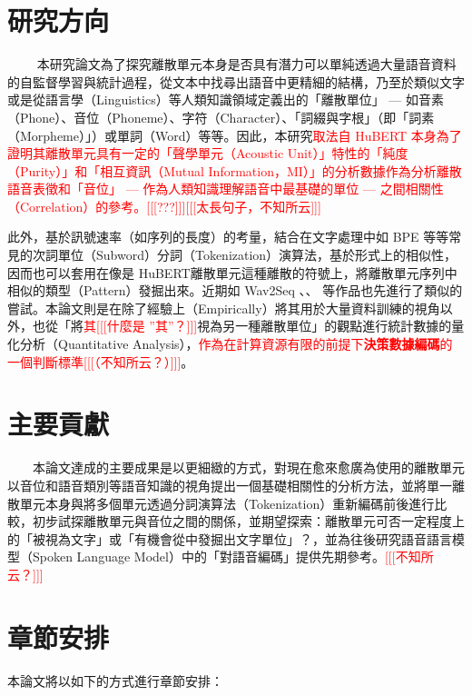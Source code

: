 \section{研究方向}
　　
本研究論文為了探究離散單元本身是否具有潛力可以單純透過大量語音資料的自監督學習與統計過程，從文本中找尋出語音中更精細的結構，乃至於類似文字或是從語言學（Linguistics）等人類知識領域定義出的「離散單位」 --- 如音素（Phone）、音位（Phoneme）、字符（Character）、「詞綴與字根」（即「詞素（Morpheme）」）或單詞（Word）等等。因此，本研究\textcolor{red}{取法自 HuBERT 本身為了證明其離散單元具有一定的「聲學單元（Acoustic Unit）」特性的「純度（Purity）」和「相互資訊（Mutual Information，MI）」的分析數據作為分析離散語音表徵和「音位」 --- 作為人類知識理解語音中最基礎的單位 --- 之間相關性（Correlation）的參考。[[[???]]][[[太長句子，不知所云]]]}

        此外，基於訊號速率（如序列的長度）的考量，結合在文字處理中如 BPE 等等常見的次詞單位（Subword）分詞（Tokenization）演算法，基於形式上的相似性，因而也可以套用在像是 HuBERT離散單元這種離散的符號上，將離散單元序列中相似的類型（Pattern）發掘出來。近期如 Wav2Seq \cite{wu_wav2seq_2023}、\cite{ren_speech_2022}、\cite{chang_exploring_2024} 等作品也先進行了類似的嘗試。本論文則是在除了經驗上（Empirically）將其用於大量資料訓練的視角以外，也從「將\textcolor{red}{其[[[什麼是 ''其''？]]]}視為另一種離散單位」的觀點進行統計數據的量化分析（Quantitative Analysis），\textcolor{red}{作為在計算資源有限的前提下\textbf{決策數據編碼}的一個判斷標準[[[（不知所云？）]]]}。

\section{主要貢獻}

　　本論文達成的主要成果是以更細緻的方式，對現在愈來愈廣為使用的離散單元以音位和語音類別等語音知識的視角提出一個基礎相關性的分析方法，並將單一離散單元本身與將多個單元透過分詞演算法（Tokenization）重新編碼前後進行比較，初步試探離散單元與音位之間的關係，並期望探索：離散單元可否一定程度上的「被視為文字」或「有機會從中發掘出文字單位」？，並為往後研究語音語言模型（Spoken Language Model）中的「對語音編碼」提供先期參考。\textcolor{red}{[[[不知所云？]]]}

\section{章節安排}

本論文將以如下的方式進行章節安排：

